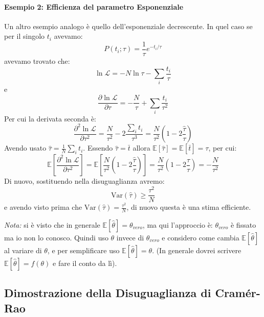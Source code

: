\documentclass[openany,a4paper,12pt]{book}
\providecommand{\mathscr}[1]{\mathcal{#1}}
\theoremstyle{remark}
\begin{document}
\paragraph{Esempio 2: Efficienza del parametro Esponenziale}
Un altro esempio analogo è quello dell'esponenziale decrescente. In quel caso se per il singolo $t_i$ avevamo:
\begin{equation}
    P(t_i; \tau) = \frac{1}{\tau} e^{-t_i/\tau}
\end{equation}
avevamo trovato che:
\begin{equation}
    \ln \mathscr{L} = -N\ln \tau - \sum_i \frac{t_i}{\tau}
\end{equation}
e
\begin{equation}
    \frac{\partial \ln \mathscr{L}}{\partial \tau} = -\frac{N}{\tau} + \sum_i \frac{t_i}{\tau^2}
\end{equation}
Per cui la derivata seconda è:
\begin{equation}
    \frac{\partial^2 \ln \mathscr{L}}{\partial \tau^2} = \frac{N}{\tau^2} - 2\frac{\sum_i t_i}{\tau^3} = \frac{N}{\tau^2} \left( 1 - 2\frac{\hat{\tau}}{\tau} \right)
\end{equation}
Avendo usato $\hat{\tau} = \frac{1}{N}\sum_i t_i$.
Essendo $\hat{\tau} = \bar{t}$ allora $\mathbb{E}[\hat{\tau}] = \mathbb{E}[\bar{t}] = \tau$, per cui:
\begin{equation}
    \mathbb{E}\left[ \frac{\partial^2 \ln \mathscr{L}}{\partial \tau^2} \right] = \mathbb{E}\left[ \frac{N}{\tau^2}\left(1 - 2\frac{\hat{\tau}}{\tau}\right) \right] = \frac{N}{\tau^2} \left(1 - 2\frac{\tau}{\tau}\right) = -\frac{N}{\tau^2}
\end{equation}
Di nuovo, sostituendo nella disuguaglianza avremo:
\begin{equation}
    \mathrm{Var}(\hat{\tau}) \geq \frac{\tau^2}{N}
\end{equation}
e avendo visto prima che $\mathrm{Var}(\hat{\tau}) = \frac{\tau^2}{N}$, di nuovo questa è una stima efficiente.

\textit{Nota:} si è visto che in generale $\mathbb{E}[\hat{\theta}] = \theta_{vero}$, ma qui l'approccio è: $\theta_{vero}$ è fissato ma io non lo conosco. Quindi uso $\theta$ invece di $\theta_{vero}$ e considero come cambia $\mathbb{E}[\hat{\theta}]$ al variare di $\theta$, e per semplificare uso $\mathbb{E}[\hat{\theta}] = \theta$. (In generale dovrei scrivere $\mathbb{E}[\hat{\theta}] = f(\theta)$ e fare il conto da lì).


\subsection*{Dimostrazione della Disuguaglianza di Cramér-Rao}
\end{document}
